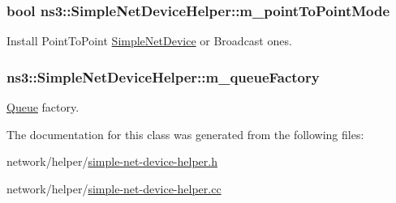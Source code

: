 \subsubsection[{\texorpdfstring{m\+\_\+point\+To\+Point\+Mode}{m_pointToPointMode}}]{\setlength{\rightskip}{0pt plus 5cm}bool ns3\+::\+Simple\+Net\+Device\+Helper\+::m\+\_\+point\+To\+Point\+Mode\hspace{0.3cm}{\ttfamily [private]}}\hypertarget{classns3_1_1SimpleNetDeviceHelper_ae12061387bb5a253a4f812a34e90d5a5}{}\label{classns3_1_1SimpleNetDeviceHelper_ae12061387bb5a253a4f812a34e90d5a5}


Install Point\+To\+Point \hyperlink{classns3_1_1SimpleNetDevice}{Simple\+Net\+Device} or Broadcast ones. 

\subsubsection[{\texorpdfstring{m\+\_\+queue\+Factory}{m_queueFactory}}]{ ns3\+::\+Simple\+Net\+Device\+Helper\+::m\+\_\+queue\+Factory\hspace{0.3cm}{\ttfamily [private]}}\hypertarget{classns3_1_1SimpleNetDeviceHelper_a418875bf03c8a15b617f4cdcb57f69ef}{}\label{classns3_1_1SimpleNetDeviceHelper_a418875bf03c8a15b617f4cdcb57f69ef}


\hyperlink{classns3_1_1Queue}{Queue} factory. 



The documentation for this class was generated from the following files\+:\begin{DoxyCompactItemize}
\item 
network/helper/\hyperlink{simple-net-device-helper_8h}{simple-\/net-\/device-\/helper.\+h}\item 
network/helper/\hyperlink{simple-net-device-helper_8cc}{simple-\/net-\/device-\/helper.\+cc}\end{DoxyCompactItemize}
